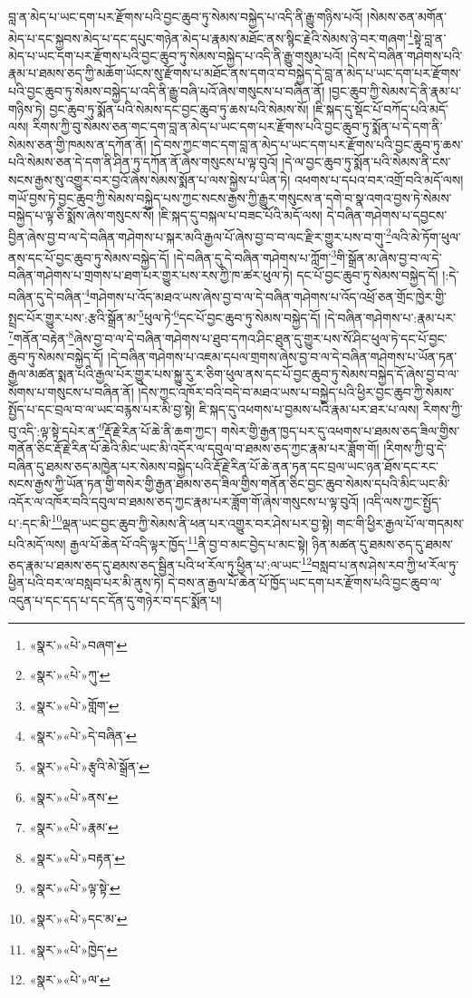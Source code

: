 བླ་ན་མེད་པ་ཡང་དག་པར་རྫོགས་པའི་བྱང་ཆུབ་ཏུ་སེམས་བསྐྱེད་པ་འདི་ནི་རྒྱུ་གཉིས་པའོ། །སེམས་ཅན་མགོན་མེད་པ་དང་སྐྱབས་མེད་པ་དང་དཔུང་གཉེན་མེད་པ་རྣམས་མཐོང་ནས་སྙིང་རྗེའི་སེམས་ཉེ་བར་གཞག་\footnote{«སྣར་»«པེ་»བཞག་}སྟེ་བླ་ན་མེད་པ་ཡང་དག་པར་རྫོགས་པའི་བྱང་ཆུབ་ཏུ་སེམས་བསྐྱེད་པ་འདི་ནི་རྒྱུ་གསུམ་པའོ། །དེས་དེ་བཞིན་གཤེགས་པའི་རྣམ་པ་ཐམས་ཅད་ཀྱི་མཆོག་ཡོངས་སུ་རྫོགས་པ་མཐོང་ནས་དགའ་བ་བསྐྱེད་དེ་བླ་ན་མེད་པ་ཡང་དག་པར་རྫོགས་པའི་བྱང་ཆུབ་ཏུ་སེམས་བསྐྱེད་པ་འདི་ནི་རྒྱུ་བཞི་པའོ་ཞེས་གསུངས་པ་བཞིན་ནོ། །བྱང་ཆུབ་ཀྱི་སེམས་དེ་ནི་རྣམ་པ་གཉིས་ཏེ། བྱང་ཆུབ་ཏུ་སྨོན་པའི་སེམས་དང་བྱང་ཆུབ་ཏུ་ཆས་པའི་སེམས་སོ། །ཇི་སྐད་དུ་སྡོང་པོ་བཀོད་པའི་མདོ་ལས། རིགས་ཀྱི་བུ་སེམས་ཅན་གང་དག་བླ་ན་མེད་པ་ཡང་དག་པར་རྫོགས་པའི་བྱང་ཆུབ་ཏུ་སྨོན་པ་དེ་དག་ནི་སེམས་ཅན་གྱི་ཁམས་ན་དཀོན་ནོ། །དེ་བས་ཀྱང་གང་དག་བླ་ན་མེད་པ་ཡང་དག་པར་རྫོགས་པའི་བྱང་ཆུབ་ཏུ་ཆས་པའི་སེམས་ཅན་དེ་དག་ནི་ཤིན་ཏུ་དཀོན་ནོ་ཞེས་གསུངས་པ་ལྟ་བུའོ། །དེ་ལ་བྱང་ཆུབ་ཏུ་སྨོན་པའི་སེམས་ནི་ངས་སངས་རྒྱས་སུ་འགྱུར་བར་བྱའོ་ཞེས་སེམས་སྨོན་པ་ལས་སྐྱེས་པ་ཡིན་ཏེ། འཕགས་པ་དཔའ་བར་འགྲོ་བའི་མདོ་ལས། གཡོ་བྱས་ཏེ་བྱང་ཆུབ་ཀྱི་སེམས་བསྐྱེད་པས་ཀྱང་སངས་རྒྱས་ཀྱི་རྒྱུར་གསུངས་ན་དགེ་བ་སྣ་འགའ་བྱས་ཏེ་སེམས་བསྐྱེད་པ་ལྟ་ཅི་སྨོས་ཞེས་གསུངས་སོ། །ཇི་སྐད་དུ་བསྐལ་པ་བཟང་པོའི་མདོ་ལས། དེ་བཞིན་གཤེགས་པ་དབྱངས་བྱིན་ཞེས་བྱ་བ་ལ་དེ་བཞིན་གཤེགས་པ་སྐར་མའི་རྒྱལ་པོ་ཞེས་བྱ་བ་བ་ལང་རྫིར་གྱུར་པས་བ་གུ་\footnote{«སྣར་»«པེ་»ཀུ་}ལའི་མེ་ཏོག་ཕུལ་ནས་དང་པོ་བྱང་ཆུབ་ཏུ་སེམས་བསྐྱེད་དོ། །དེ་བཞིན་དུ་དེ་བཞིན་གཤེགས་པ་ཀློག་\footnote{«སྣར་»«པེ་»གློག་}གི་སྒྲོན་མ་ཞེས་བྱ་བ་ལ་དེ་བཞིན་གཤེགས་པ་གྲགས་པ་ཐག་པར་གྱུར་པས་རས་ཀྱི་ཁ་ཚར་ཕུལ་ཏེ། དང་པོ་བྱང་ཆུབ་ཏུ་སེམས་བསྐྱེད་དོ། །:དེ་བཞིན་དུ་དེ་བཞིན་\footnote{«སྣར་»«པེ་»དེ་བཞིན་}གཤེགས་པ་འོད་མཐའ་ཡས་ཞེས་བྱ་བ་ལ་དེ་བཞིན་གཤེགས་པ་འོད་འཕྲོ་ཅན་གྲོང་ཁྱེར་གྱི་སྤྲང་པོར་གྱུར་པས་:རྩའི་སྒྲོན་མ་\footnote{«སྣར་»«པེ་»རྩྭའི་མེ་སྒྲོན་}ཕུལ་ཏེ་\footnote{«སྣར་»«པེ་»ནས་}དང་པོ་བྱང་ཆུབ་ཏུ་སེམས་བསྐྱེད་དོ། །དེ་བཞིན་གཤེགས་པ་:རྣམ་པར་\footnote{«སྣར་»«པེ་»རྣམ་}གནོན་བརྟེན་\footnote{«སྣར་»«པེ་»བརྟན་}ཞེས་བྱ་བ་ལ་དེ་བཞིན་གཤེགས་པ་ཐུབ་དཀའ་ཤིང་ཐུན་དུ་གྱུར་པས་སོ་ཤིང་ཕུལ་ཏེ་དང་པོ་བྱང་ཆུབ་ཏུ་སེམས་བསྐྱེད་དོ། །དེ་བཞིན་གཤེགས་པ་འཇམ་དཔལ་གྲགས་ཞེས་བྱ་བ་ལ་དེ་བཞིན་གཤེགས་པ་ཡོན་ཏན་རྒྱལ་མཚན་སྨན་པའི་རྒྱལ་པོར་གྱུར་པས་སྐྱུ་རུ་ར་ཅིག་ཕུལ་ནས་དང་པོ་བྱང་ཆུབ་ཏུ་སེམས་བསྐྱེད་དོ་ཞེས་བྱ་བ་ལ་སོགས་པ་གསུངས་པ་བཞིན་ནོ། །དེས་ཀྱང་འཁོར་བའི་བདེ་བ་མཐའ་ཡས་པ་བསྐྱེད་པའི་ཕྱིར་བྱང་ཆུབ་ཀྱི་སེམས་སྤྱོད་པ་དང་བྲལ་བ་ལ་ཡང་བརྙས་པར་མི་བྱ་སྟེ། ཇི་སྐད་དུ་འཕགས་པ་བྱམས་པའི་རྣམ་པར་ཐར་པ་ལས། རིགས་ཀྱི་བུ་འདི་:ལྟ་སྟེ་དཔེར་ན་\footnote{«སྣར་»«པེ་»ལྟ་སྟེ་}རྡོ་རྗེ་རིན་པོ་ཆེ་ནི་ཆག་ཀྱང་། གསེར་གྱི་རྒྱན་ཁྱད་པར་དུ་འཕགས་པ་ཐམས་ཅད་ཟིལ་གྱིས་གནོན་ཅིང་རྡོ་རྗེ་རིན་པོ་ཆེའི་མིང་ཡང་མི་འདོར་ལ་དབུལ་བ་ཐམས་ཅད་ཀྱང་རྣམ་པར་ཟློག་གོ། །རིགས་ཀྱི་བུ་དེ་བཞིན་དུ་ཐམས་ཅད་མཁྱེན་པར་སེམས་བསྐྱེད་པའི་རྡོ་རྗེ་རིན་པོ་ཆེ་ནན་ཏན་དང་བྲལ་ཡང་ཉན་ཐོས་དང་རང་སངས་རྒྱས་ཀྱི་ཡོན་ཏན་གྱི་གསེར་གྱི་རྒྱན་ཐམས་ཅད་ཟིལ་གྱིས་གནོན་ཅིང་བྱང་ཆུབ་སེམས་དཔའི་མིང་ཡང་མི་འདོར་ལ་འཁོར་བའི་དབུལ་བ་ཐམས་ཅད་ཀྱང་རྣམ་པར་ཟློག་གོ་ཞེས་གསུངས་པ་ལྟ་བུའོ། །འདི་ལས་ཀྱང་སྤྱོད་པ་:དང་མི་\footnote{«སྣར་»«པེ་»དང་མ་}ལྡན་ཡང་བྱང་ཆུབ་ཀྱི་སེམས་ནི་ཕན་པར་འགྱུར་བར་ཤེས་པར་བྱ་སྟེ། གང་གི་ཕྱིར་རྒྱལ་པོ་ལ་གདམས་པའི་མདོ་ལས། རྒྱལ་པོ་ཆེན་པོ་འདི་ལྟར་ཁྱོད་\footnote{«སྣར་»«པེ་»ཁྱེད་}ནི་བྱ་བ་མང་བྱེད་པ་མང་སྟེ། ཉིན་མཚན་དུ་ཐམས་ཅད་དུ་ཐམས་ཅད་རྣམ་པ་ཐམས་ཅད་དུ་ཐམས་ཅད་སྦྱིན་པའི་ཕ་རོལ་ཏུ་ཕྱིན་པ་:ལ་ཡང་\footnote{«སྣར་»«པེ་»ལ་}བསླབ་པ་ནས་ཤེས་རབ་ཀྱི་ཕ་རོལ་ཏུ་ཕྱིན་པའི་བར་ལ་བསླབ་པར་མི་ནུས་ཏེ། དེ་བས་ན་རྒྱལ་པོ་ཆེན་པོ་ཁྱོད་ཡང་དག་པར་རྫོགས་པའི་བྱང་ཆུབ་ལ་འདུན་པ་དང་དད་པ་དང་དོན་དུ་གཉེར་བ་དང་སྨོན་པ། 